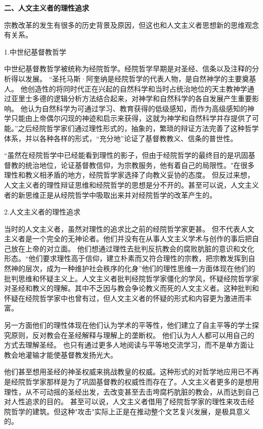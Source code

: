 \documentclass[UTF8]{ctexart}
\begin{document}
    \textbf{二、人文主义者的理性追求}\par
    宗教改革的发生有很多的历史背景及原因，但这也和人文主义者思想新的思维观念有关系。\par
    
    1.中世纪基督教哲学\par
    中世纪基督教哲学被统称为经院哲学。经院哲学早期是对圣经、信条以及注释的分析得以发展。
    “圣托马斯·阿奎纳是经院哲学的代表人物，是自然神学的主要奠基人。
    他创造性的将同时代正在兴起的自然科学和当时占统治地位的天主教神学通过亚里士多德的逻辑分析方法结合起来，对神学和自然科学的各自发展产生重要影响。
    他认为自然科学为可通过学习、教育获得的低级感知，而作为高级感知的神学只能由上帝偶尔闪现的神迹和启示来获得，这就为神学和自然科学并存提供了可能。”\footnotemark[5]
    之后经院哲学家们通过理性形式的，抽象的，繁琐的辩证方法完善了这种哲学体系，并以各种各样的形式，“充分地”论证了基督教教义、信条的普世性。\par
    “虽然在经院哲学中已经能看到理性的影子，但由于经院哲学的最终目的是巩固基督教的统治地位，论证基督教信仰，为宗教服务，他有着自己的局限性。"\footnotemark[6]
    在很多理性和教义相矛盾的地方，经院哲学家选择了向教义妥协的态度。
    但反过来想，人文主义者的理性辩证思维和经院哲学的思想是分不开的。甚至可以说，人文主义者的新思维正是从经院哲学中吸取出来并对经院哲学的改革产生的。\par
    2.人文主义者的理性追求\par
    当时的人文主义者，虽然对理性的追求比之前的经院哲学家更甚。
    但不代表人文主义者是一个完全的无神论者。他们并没有在从事人文主义学术与创作的事后把自己放在上帝的对立面。
    他们想通过理性去批判反抗教会的腐败肮脏的意识和文化形态。“他们要求理性高于信仰，建立朴素而又符合理性的宗教，把宗教发挥到自然神的层次，成为一种维护社会秩序的化身”\footnotemark[7]
    他们的理性思维一方面体现在他们的批判思维和怀疑主义上。人文主义者批判经院哲学家僵化的学风，怀疑经院哲学家对圣经和教义的理解。其中不乏因与教会争论教义而死的人文主义者。这种批判和怀疑在经院哲学家中也曾有过，但人文主义者的怀疑的形式和内容更为激进而丰富。\par
    另一方面他们的理性体现在他们认为学术的平等性，他们建立了自主平等的学士探究原则，反对教会在圣经解释与理解上的垄断权。
    他们认为人人都可以用自己的方式去理解圣经。
    也只有通过更多人地阅读与平等地交流学习，而不是单方面让教会地灌输才能使基督教发扬光大。\par
    他们甚至想用圣经的神圣权威来挑战教皇的权威。这种形式的对哲学地应用已不再是经院哲学家那样是为了巩固基督教的权威性而存在了。人文主义者更多的是想用理性，从不可动摇的圣经出发，去改变甚至去击垮腐朽肮脏的教会，从而达到自己对人性追求的目的。
    甚至可以说，人文主义者借用了经院哲学家的理性来攻击经院哲学的建筑。但这种"攻击"实际上正是在推动整个文艺复兴发展，是极具意义的。\par
\end{document}
